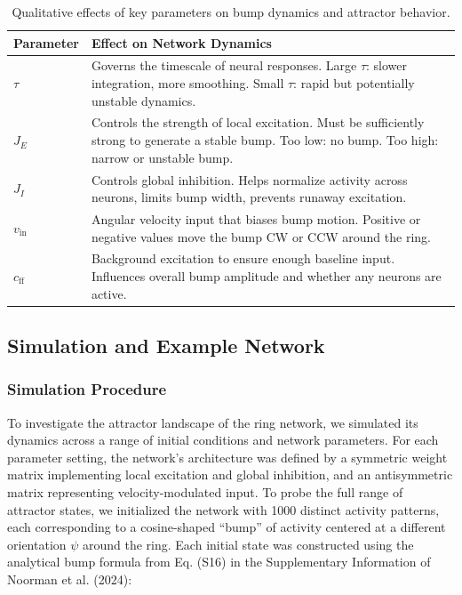 \documentclass[11pt,a4paper]{article}
\begin{document}
\begin{table}[h!]
\centering
\begin{tabular}{@{}lp{12cm}@{}}
\toprule
\textbf{Parameter} & \textbf{Effect on Network Dynamics} \\
\midrule
\( \tau \) & Governs the timescale of neural responses. Large \( \tau \): slower integration, more smoothing. Small \( \tau \): rapid but potentially unstable dynamics. \\
\( J_E \) & Controls the strength of local excitation. Must be sufficiently strong to generate a stable bump. Too low: no bump. Too high: narrow or unstable bump. \\
\( J_I \) & Controls global inhibition. Helps normalize activity across neurons, limits bump width, prevents runaway excitation. \\
\( v_{\text{in}} \) & Angular velocity input that biases bump motion. Positive or negative values move the bump CW or CCW around the ring. \\
\( c_{\text{ff}} \) & Background excitation to ensure enough baseline input. Influences overall bump amplitude and whether any neurons are active. \\
\bottomrule
\end{tabular}
\caption{Qualitative effects of key parameters on bump dynamics and attractor behavior.}
\end{table}

\subsection{Simulation and Example Network}

\subsubsection*{Simulation Procedure}

To investigate the attractor landscape of the ring network, we simulated its dynamics across a range of initial conditions and network parameters. 
For each parameter setting, the network’s architecture was defined by a symmetric weight matrix implementing local excitation and global inhibition, and an antisymmetric matrix representing velocity-modulated input. 
To probe the full range of attractor states, we initialized the network with 1000 distinct activity patterns, each corresponding to a cosine-shaped “bump” of activity centered at a different orientation $\psi$ around the ring.
Each initial state was constructed using the analytical bump formula from Eq. (S16) in the Supplementary Information of Noorman et al. (2024):
\end{document}
